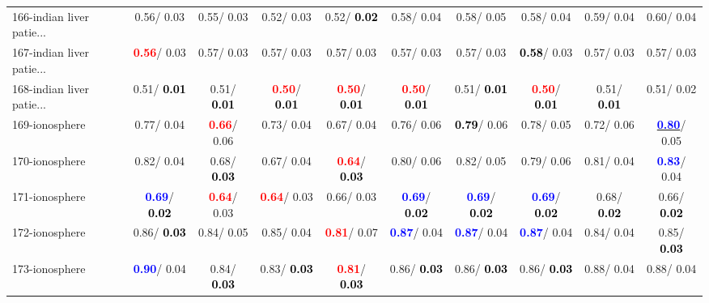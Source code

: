 \begin{table}[h]
\begin{center}
{\begin{tabular}{lc|c|c|c|c|c|c|c|c}
166-indian liver patie... &   0.56/  0.03 &   0.55/  0.03 &   0.52/  0.03 &   0.52/\textcolor{black}{\textbf{  0.02}} &   0.58/  0.04 &   0.58/  0.05 &   0.58/  0.04 &   0.59/  0.04 &   0.60/  0.04 \\
167-indian liver patie... & \textcolor{red}{\textbf{  0.56}}/  0.03 &   0.57/  0.03 &   0.57/  0.03 &   0.57/  0.03 &   0.57/  0.03 &   0.57/  0.03 & \textcolor{black}{\textbf{  0.58}}/  0.03 &   0.57/  0.03 &   0.57/  0.03 \\ \hline
168-indian liver patie... &   0.51/\textcolor{black}{\textbf{  0.01}} &   0.51/\textcolor{black}{\textbf{  0.01}} & \textcolor{red}{\textbf{  0.50}}/\textcolor{black}{\textbf{  0.01}} & \textcolor{red}{\textbf{  0.50}}/\textcolor{black}{\textbf{  0.01}} & \textcolor{red}{\textbf{  0.50}}/\textcolor{black}{\textbf{  0.01}} &   0.51/\textcolor{black}{\textbf{  0.01}} & \textcolor{red}{\textbf{  0.50}}/\textcolor{black}{\textbf{  0.01}} &   0.51/\textcolor{black}{\textbf{  0.01}} &   0.51/  0.02 \\
169-ionosphere &   0.77/  0.04 & \textcolor{red}{\textbf{  0.66}}/  0.06 &   0.73/  0.04 &   0.67/  0.04 &   0.76/  0.06 & \textcolor{black}{\textbf{  0.79}}/  0.06 &   0.78/  0.05 &   0.72/  0.06 & \underline{\textcolor{blue}{\textbf{  0.80}}}/  0.05 \\
170-ionosphere &   0.82/  0.04 &   0.68/\textcolor{black}{\textbf{  0.03}} &   0.67/  0.04 & \textcolor{red}{\textbf{  0.64}}/\textcolor{black}{\textbf{  0.03}} &   0.80/  0.06 &   0.82/  0.05 &   0.79/  0.06 &   0.81/  0.04 & \textcolor{blue}{\textbf{  0.83}}/  0.04 \\
171-ionosphere & \textcolor{blue}{\textbf{  0.69}}/\textcolor{black}{\textbf{  0.02}} & \textcolor{red}{\textbf{  0.64}}/  0.03 & \textcolor{red}{\textbf{  0.64}}/  0.03 &   0.66/  0.03 & \textcolor{blue}{\textbf{  0.69}}/\textcolor{black}{\textbf{  0.02}} & \textcolor{blue}{\textbf{  0.69}}/\textcolor{black}{\textbf{  0.02}} & \textcolor{blue}{\textbf{  0.69}}/\textcolor{black}{\textbf{  0.02}} &   0.68/\textcolor{black}{\textbf{  0.02}} &   0.66/\textcolor{black}{\textbf{  0.02}} \\
172-ionosphere &   0.86/\textcolor{black}{\textbf{  0.03}} &   0.84/  0.05 &   0.85/  0.04 & \textcolor{red}{\textbf{  0.81}}/  0.07 & \textcolor{blue}{\textbf{  0.87}}/  0.04 & \textcolor{blue}{\textbf{  0.87}}/  0.04 & \textcolor{blue}{\textbf{  0.87}}/  0.04 &   0.84/  0.04 &   0.85/\textcolor{black}{\textbf{  0.03}} \\
173-ionosphere & \textcolor{blue}{\textbf{  0.90}}/  0.04 &   0.84/\textcolor{black}{\textbf{  0.03}} &   0.83/\textcolor{black}{\textbf{  0.03}} & \textcolor{red}{\textbf{  0.81}}/\textcolor{black}{\textbf{  0.03}} &   0.86/\textcolor{black}{\textbf{  0.03}} &   0.86/\textcolor{black}{\textbf{  0.03}} &   0.86/\textcolor{black}{\textbf{  0.03}} &   0.88/  0.04 &   0.88/  0.04 \\

\end{tabular}}
\end{center}
\end{table}
